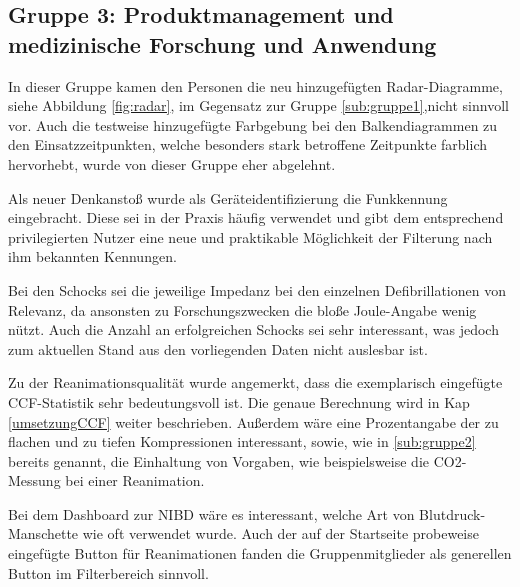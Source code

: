 \subsection{Gruppe 3: Produktmanagement und medizinische Forschung und Anwendung}
\label{sub:gruppe3}

In dieser Gruppe kamen den Personen die neu hinzugefügten Radar-Diagramme, siehe Abbildung \ref{fig:radar}, im Gegensatz zur Gruppe \ref{sub:gruppe1},nicht sinnvoll vor.
Auch die testweise hinzugefügte Farbgebung bei den Balkendiagrammen zu den Einsatzzeitpunkten, welche besonders stark betroffene Zeitpunkte farblich hervorhebt, wurde von dieser Gruppe eher abgelehnt.

Als neuer Denkanstoß wurde als Geräteidentifizierung die Funkkennung eingebracht.
Diese sei in der Praxis häufig verwendet und gibt dem entsprechend privilegierten Nutzer eine neue und praktikable Möglichkeit der Filterung nach ihm bekannten Kennungen.

Bei den Schocks sei die jeweilige Impedanz bei den einzelnen Defibrillationen von Relevanz, da ansonsten zu Forschungszwecken die bloße Joule-Angabe wenig nützt.
Auch die Anzahl an erfolgreichen Schocks sei sehr interessant, was jedoch zum aktuellen Stand aus den vorliegenden Daten nicht auslesbar ist.

Zu der Reanimationsqualität wurde angemerkt, dass die exemplarisch eingefügte \gls{CCF}-Statistik sehr bedeutungsvoll ist. 
Die genaue Berechnung wird in Kap \ref{umsetzungCCF} weiter beschrieben.
Außerdem wäre eine Prozentangabe der zu flachen und zu tiefen Kompressionen interessant, sowie, wie in \ref{sub:gruppe2} bereits genannt, die Einhaltung von Vorgaben, wie beispielsweise die CO2-Messung bei einer Reanimation.

Bei dem Dashboard zur \gls{NIBD} wäre es interessant, welche Art von Blutdruck-Manschette wie oft verwendet wurde.
Auch der auf der Startseite probeweise eingefügte \gls{Button} für Reanimationen fanden die Gruppenmitglieder als generellen Button im Filterbereich sinnvoll.


